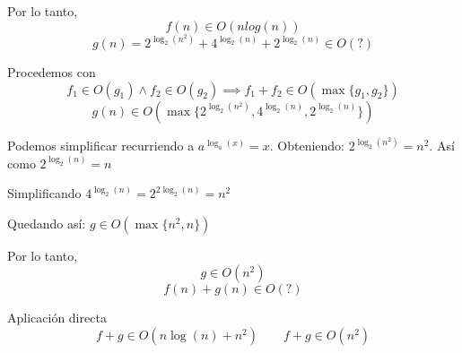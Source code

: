 \documentclass{article}
\begin{document}
	Por lo tanto, \[ f(n) \in O(nlog(n))\]
	{\LARGE
	\begin{displaymath}
		g(n) = 2^{\log_2 (n^2)} + 4^{\log_2 (n)} + 2^{\log_2 (n)} \in O(?)
	\end{displaymath}
	}
	
	Procedemos con
	\[
		f_1 \in O(g_1) \land f_2 \in O(g_2) \implies f_1 + f_2 \in O(\max \{g_1, g_2\})
	\]
	\[
		g(n) \in O(\max \{2^{\log_2 (n^2)}, 4^{\log_2 (n)}, 2^{\log_2 (n)}\})
	\]
	
	Podemos simplificar recurriendo a $a^{\log_a (x)} = x$. Obteniendo: $2^{\log_2 (n^2)} = n^2$. Así como $2^{\log_2(n)} = n$
	
	Simplificando $4^{\log_2 (n)} = 2^{2\log_2 (n)} = n^2$
	
	Quedando así: $g \in O(\max \{ n^2, n \})$
	
	Por lo tanto,
	\[
		g \in O(n^2)
	\]
	{\LARGE
	\begin{displaymath}
		f (n) + g(n) \in O(?)
	\end{displaymath}
	}

	Aplicación directa
	\[
		f + g \in O(n \log(n) + n^2) \qquad f + g \in O(n^2)
	\]
	
\end{document}

